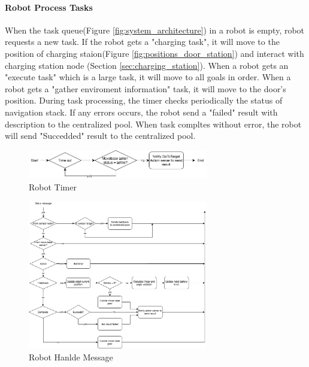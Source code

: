 \paragraph{Robot Process Tasks}
When the task queue(Figure \ref{fig:system_architecture}) in a robot is empty, robot requests a new task. If the robot gets a "charging task", it will move to the position of charging staion(Figure \ref{fig:positions_door_station}) and interact with charging station node (Section \ref{sec:charging_station}).
When a robot gets an "execute task" which is a large task, it will move to all goals in order.
When a robot gets a "gather enviroment information" task, it will move to the door's position.
During task processing, the timer checks periodically the status of navigation stack. If any errors occurs, the robot send a "failed" result with description to the centralized pool.  
When task compltes without error, the robot will send "Succedded" result to the centralized pool.


\begin{figure}[htbp]
    \centering
    \includegraphics[width = 0.7\textwidth]{content/images/ch4/robot_timer.drawio.png}
    \caption{Robot Timer}
    \label{fig:robot_timer}
\end{figure}

\begin{figure}[htbp]
    \centering
    \includegraphics[width = 0.7\textwidth]{content/images/ch4/robot_message.drawio.png}
    \caption{Robot Hanlde Message}
    \label{fig:robot_handle_message}
\end{figure}


